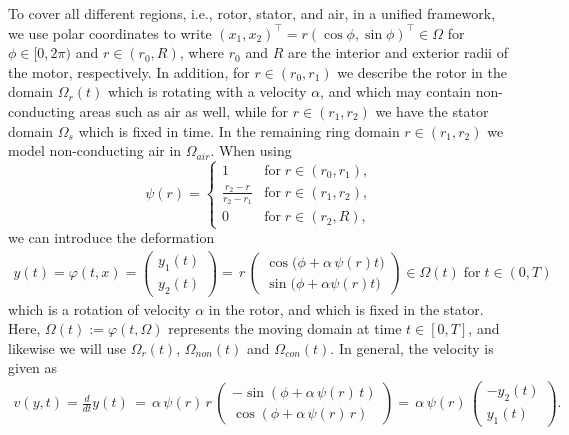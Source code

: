 \documentclass[12pt]{article}
\numberwithin{equation}{section}
\begin{document}
To cover all different regions, i.e., rotor, stator, and air, in a unified
framework, we use polar coordinates to write
$(x_1,x_2)^\top = r (\cos \phi , \sin \phi)^\top \in \Omega$
for $\phi \in [0,2\pi)$ and $r \in (r_0,R)$, where $r_0$ and $R$ are
the interior and exterior radii of the motor, respectively. In addition,
for $ r \in (r_0,r_1)$ we describe the rotor in the domain $\Omega_r(t)$
which is rotating with a velocity $\alpha$, and
which may contain non-conducting areas such as air as well, while for
$r \in (r_1,r_2)$ we have the stator domain $\Omega_s$ which is fixed in
time. In the remaining ring domain $r \in (r_1,r_2)$ we model non-conducting
air in $\Omega_{air}$. When using
\[
  \psi(r) = \left \{
    \begin{array}{cl}
      1 & \mbox{for} \; r \in (r_0,r_1), \\[2mm] \displaystyle
      \frac{r_2-r}{r_2-r_1} & \mbox{for} \; r \in (r_1,r_2), \\[3mm]
      0 & \mbox{for} \; r \in (r_2,R),
    \end{array}
  \right.
\]
we can introduce the deformation
\begin{align}\label{Def Rotation}
  y(t) = \varphi(t,x) =
  \begin{pmatrix}
    y_1(t) \\[2mm]
    y_2(t)
  \end{pmatrix}
  = \, r \,
  \begin{pmatrix}
    \cos\Big(\phi + \alpha \, \psi(r) t \Big) \\[1mm]
    \sin\Big(\phi + \alpha \psi(r) t \Big)
\end{pmatrix} \in \Omega(t) \; \mbox{for} \; t \in (0,T)
\end{align}
which is a rotation of velocity $\alpha$ in the rotor, and which is
fixed in the stator. Here, $\Omega(t) := \varphi(t, \Omega)$ represents
the moving domain at time $t\in [0,T]$, and likewise we will use
$\Omega_r(t)$, $\Omega_{non}(t)$ and $\Omega_{con}(t)$.
In general, the velocity is given as
\begin{align*}
  v(y,t) = \frac{d}{dt} y(t) \,
  = \, \alpha \, \psi(r) \, r \,
  \begin{pmatrix}
    - \sin\left(\phi + \alpha \, \psi(r) \, t \right) \\[1mm]
    \cos\left(\phi + \alpha \, \psi(r) \, r \right)
  \end{pmatrix}
  = \, \alpha \, \psi(r) \, 
  \begin{pmatrix}
    - y_2(t) \\[2mm]
    y_1(t)
  \end{pmatrix}.
\end{align*}
\end{document}
